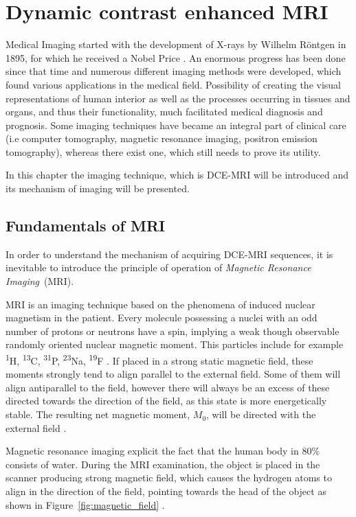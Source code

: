 \chapter{Dynamic contrast enhanced MRI}
	
Medical Imaging started with the development of X-rays by Wilhelm Röntgen in 1895, for which he received a Nobel Price \cite{rontgen1896new}. 
An enormous progress has been done since that time and numerous different imaging methods were developed, which found various applications in the medical field. Possibility of creating the visual representations of human interior as well as the processes occurring in tissues and organs, and thus their functionality, much facilitated medical diagnosis and prognosis.   
Some imaging techniques have became an integral part of clinical care (i.e computer tomography, magnetic resonance imaging, positron emission tomography), whereas there exist one, which still needs to prove its utility. 

In this chapter the imaging technique, which is DCE-MRI will be introduced and its mechanism of imaging will be presented.

\section{Fundamentals of MRI}
In order to understand the mechanism of acquiring DCE-MRI sequences, it is inevitable to introduce the principle of operation of \textit{Magnetic Resonance Imaging}~(MRI).

MRI is an imaging technique based on the phenomena of induced nuclear  magnetism in the patient. Every molecule possessing a nuclei with an odd number of protons or neutrons  have a spin, implying a weak though observable randomly oriented nuclear magnetic moment. 
This particles include for example \textsuperscript{1}H, \textsuperscript{13}C, \textsuperscript{31}P, \textsuperscript{23}Na, \textsuperscript{19}F \nocite{bronzino1999biomedical}\cite{biomedical_hanbook_imaging, grover2015magnetic}. If placed in a strong static magnetic field, these moments strongly tend to align parallel to the external field. Some of them will align antiparallel to the field, however there will always be an excess of these directed towards the direction of the field, as this state is more energetically stable. The resulting net magnetic moment, $M_0$, will be directed with the external field \cite{bushong2014magnetic}.

Magnetic resonance imaging explicit the fact that the human body in 80\% consists of water. During the MRI examination, the object is placed in the scanner producing strong magnetic field, which causes the hydrogen atoms to align in the direction of the field, pointing towards the head of the object as shown in Figure~\ref{fig:magnetic_field} \cite{bushong2014magnetic}. 

